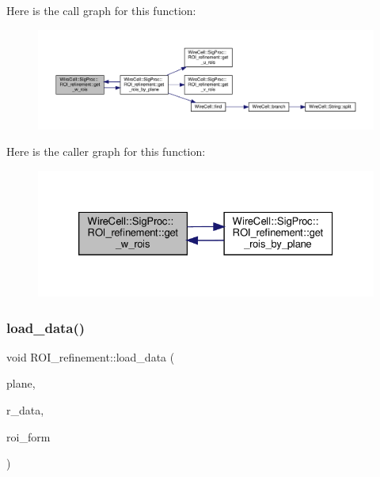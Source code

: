 Here is the call graph for this function\+:
\nopagebreak
\begin{figure}[H]
\begin{center}
\leavevmode
\includegraphics[width=350pt]{class_wire_cell_1_1_sig_proc_1_1_r_o_i__refinement_a2a9a05d4936bffcc0946a2e7190d3112_cgraph}
\end{center}
\end{figure}
Here is the caller graph for this function\+:
\nopagebreak
\begin{figure}[H]
\begin{center}
\leavevmode
\includegraphics[width=326pt]{class_wire_cell_1_1_sig_proc_1_1_r_o_i__refinement_a2a9a05d4936bffcc0946a2e7190d3112_icgraph}
\end{center}
\end{figure}
\mbox{\label{class_wire_cell_1_1_sig_proc_1_1_r_o_i__refinement_a2752abfaf6f0c8e84cef5dcec56010ee}} 
\subsubsection{\texorpdfstring{load\+\_\+data()}{load\_data()}}
{\footnotesize\ttfamily void R\+O\+I\+\_\+refinement\+::load\+\_\+data (\begin{DoxyParamCaption}\item[{int}]{plane,  }\item[{const \hyperlink{namespace_wire_cell_1_1_array_ab565fef5e33632bb02f0ed4be803020c}{Array\+::array\+\_\+xxf} \&}]{r\+\_\+data,  }\item[{\hyperlink{class_wire_cell_1_1_sig_proc_1_1_r_o_i__formation}{R\+O\+I\+\_\+formation} \&}]{roi\+\_\+form }\end{DoxyParamCaption})}



